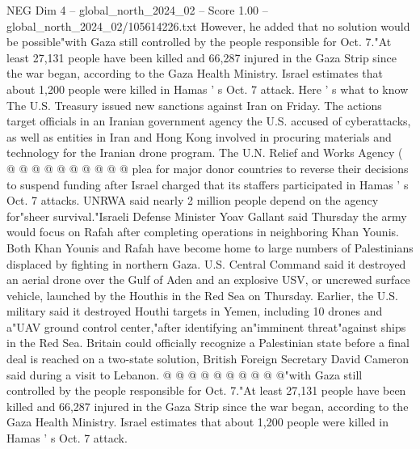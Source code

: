\begin{textsample}{NEG Dim 4 – global\_north\_2024\_02 – Score 1.00 – global\_north\_2024\_02/105614226.txt}
However, he added that no solution would be possible"with Gaza still controlled by the people responsible for Oct. 7."At least 27,131 people have been killed and 66,287 injured in the Gaza Strip since the war began, according to the Gaza Health Ministry.
Israel estimates that about 1,200 people were killed in Hamas ' s Oct. 7 attack.
Here ' s what to know The U.S.
Treasury issued new sanctions against Iran on Friday.
The actions target officials in an Iranian government agency the U.S. accused of cyberattacks, as well as entities in Iran and Hong Kong involved in procuring materials and technology for the Iranian drone program.
The U.N.
Relief and Works Agency ( @ @ @ @ @ @ @ @ @ @ plea for major donor countries to reverse their decisions to suspend funding after Israel charged that its staffers participated in Hamas ' s Oct. 7 attacks.
UNRWA said nearly 2 million people depend on the agency for"sheer survival."Israeli Defense Minister Yoav Gallant said Thursday the army would focus on Rafah after completing operations in neighboring Khan Younis.
Both Khan Younis and Rafah have become home to large numbers of Palestinians displaced by fighting in northern Gaza.
U.S.
Central Command said it destroyed an aerial drone over the Gulf of Aden and an explosive USV, or uncrewed surface vehicle, launched by the Houthis in the Red Sea on Thursday.
Earlier, the U.S. military said it destroyed Houthi targets in Yemen, including 10 drones and a"UAV ground control center,"after identifying an"imminent threat"against ships in the Red Sea.
Britain could officially recognize a Palestinian state before a final deal is reached on a two-state solution, British Foreign Secretary David Cameron said during a visit to Lebanon. @ @ @ @ @ @ @ @ @ @"with Gaza still controlled by the people responsible for Oct. 7."At least 27,131 people have been killed and 66,287 injured in the Gaza Strip since the war began, according to the Gaza Health Ministry.
Israel estimates that about 1,200 people were killed in Hamas ' s Oct. 7 attack.

\end{textsample}
